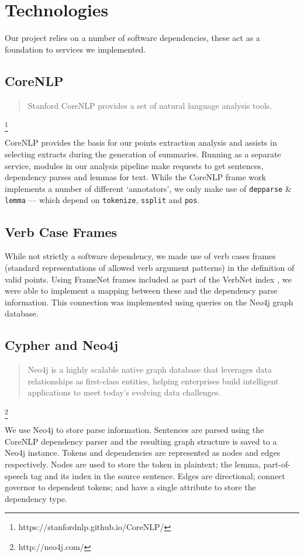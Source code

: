 \chapter{Technologies\label{chap:technologies}}
  Our project relies on a number of software dependencies, these act as a foundation to services we implemented.

  \tocless\section{CoreNLP}
    \blockquote{Stanford CoreNLP provides a set of natural language analysis tools.}\footnote{https://stanfordnlp.github.io/CoreNLP/}

    CoreNLP provides the basis for our points extraction analysis and assists in selecting extracts during the generation of summaries. Running as a separate service, modules in our analysis pipeline make requests to get sentences, dependency parses and lemmas for text. While the CoreNLP frame work implements a number of different `annotators', we only make use of \texttt{depparse} \& \texttt{lemma} --- which depend on \texttt{tokenize}, \texttt{ssplit} and \texttt{pos}.

  \tocless\section{Verb Case Frames}
    While not strictly a software dependency, we made use of verb cases frames (standard representations of allowed verb argument patterns) in the definition of valid points. Using FrameNet frames included as part of the VerbNet index \cite{schuler2005verbnet, fillmore2002framenet}, we were able to implement a mapping between these and the dependency parse information. This connection was implemented using queries on the Neo4j graph database.

  \tocless\section{Cypher and Neo4j}
    \blockquote{Neo4j is a highly scalable native graph database that leverages data relationships as first-class entities, helping enterprises build intelligent applications to meet today's evolving data challenges.}\footnote{http://neo4j.com/}

    We use Neo4j to store parse information. Sentences are parsed using the CoreNLP dependency parser and the resulting graph structure is saved to a Neo4j instance. Tokens and dependencies are represented as nodes and edges respectively. Nodes are used to store the token in plaintext; the lemma, part-of-speech tag and its index in the source sentence. Edges are directional; connect governor to dependent tokens; and have a single attribute to store the dependency type.

